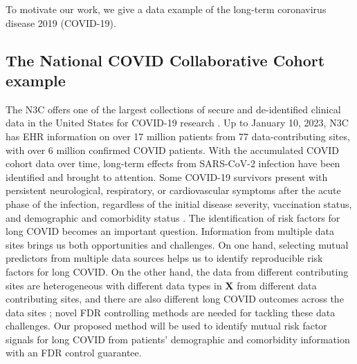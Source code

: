 \documentclass[11pt]{article}
\theoremstyle{plain}
\theoremstyle{definition}
\theoremstyle{remark}
\newcommand{\X}{\mathbf{X}}
\newcommand{\0}{\mathbf{0}}
\begin{document}
To motivate our work, we give a data example of the long-term coronavirus disease 2019 (COVID-19).

\subsection{The National COVID Collaborative Cohort example} 

The N3C offers one of the largest collections of secure and de-identified clinical data in the United States for COVID-19 research \citep{Haendel-N3C}. Up to January 10, 2023, N3C has EHR information on over 17 million patients from 77 data-contributing sites, with over 6 million confirmed COVID patients. With the accumulated COVID cohort data over time, long-term effects from SARS-CoV-2 infection have been identified and brought to attention. Some COVID-19 survivors present with persistent neurological, respiratory, or cardiovascular symptoms after the acute phase of the infection, regardless of the initial disease severity, vaccination status, and demographic and comorbidity status \citep{montani2022}. The identification of risk factors for long COVID becomes an important question. Information from multiple data sites brings us both opportunities and challenges. On one hand, selecting mutual predictors from multiple data sources helps us to identify reproducible risk factors for long COVID. On the other hand, the data from different contributing sites are heterogeneous with different data types in $\X$ from different data contributing sites, and there are also different long COVID outcomes across the data sites \citep{Pfaff2022}; novel FDR controlling methods are needed for tackling these data challenges. Our proposed method will be used to identify mutual risk factor signals for long COVID from patients' demographic and comorbidity information with an FDR control guarantee.     
\end{document}
